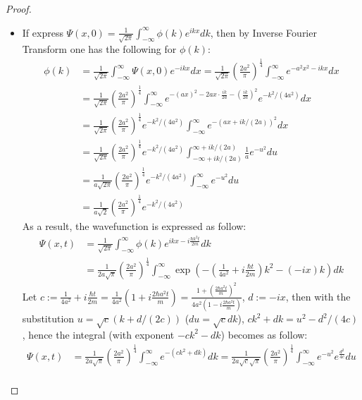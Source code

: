\documentclass{article}
\begin{document}
\begin{proof}
\begin{itemize}
        \item[2.] If express $\Psi(x,0)=\frac{1}{\sqrt{2\pi}}\int_{-\infty}^{\infty}\phi(k)e^{ikx}dk$, then by Inverse Fourier Transform one has the following for $\phi(k)$:
        \begin{align}
            \phi(k)&=\frac{1}{\sqrt{2\pi}}\int_{-\infty}^{\infty}\Psi(x,0)e^{-ikx}dx = \frac{1}{\sqrt{2\pi}}\left(\frac{2a^2}{\pi}\right)^\frac{1}{4}\int_{-\infty}^{\infty}e^{-a^2x^2-ikx}dx\\
            &= \frac{1}{\sqrt{2\pi}}\left(\frac{2a^2}{\pi}\right)^\frac{1}{4}\int_{-\infty}^{\infty}e^{-(ax)^2 - 2ax\cdot\frac{ik}{2a} - \left(\frac{ik}{2a}\right)^2}e^{-k^2/(4a^2)}dx\\
            &= \frac{1}{\sqrt{2\pi}}\left(\frac{2a^2}{\pi}\right)^\frac{1}{4}e^{-k^2/(4a^2)}\int_{-\infty}^{\infty}e^{-(ax+ik/(2a))^2}dx\\
            &= \frac{1}{\sqrt{2\pi}}\left(\frac{2a^2}{\pi}\right)^\frac{1}{4}e^{-k^2/(4a^2)}\int_{-\infty+ik/(2a)}^{\infty+ik/(2a)}\frac{1}{a}e^{-u^2}du\\
            &= \frac{1}{a\sqrt{2\pi}}\left(\frac{2a^2}{\pi}\right)^\frac{1}{4}e^{-k^2/(4a^2)}\int_{-\infty}^{\infty}e^{-u^2}du\\
            &= \frac{1}{a\sqrt{2}}\left(\frac{2a^2}{\pi}\right)^\frac{1}{4}e^{-k^2/(4a^2)}
        \end{align}
        As a result, the wavefunction is expressed as follow:
        \begin{align}
            \Psi(x,t)&= \frac{1}{\sqrt{2\pi}}\int_{-\infty}^{\infty}\phi(k)e^{ikx - i\frac{\hbar k^2 t}{2m}}dk\\
            &= \frac{1}{2a\sqrt{\pi}}\left(\frac{2a^2}{\pi}\right)^\frac{1}{4}\int_{-\infty}^{\infty}\exp\left(-\left(\frac{1}{4a^2} + i\frac{\hbar t}{2m}\right)k^2 - (-ix) k\right)dk
        \end{align}
        Let $c:=\frac{1}{4a^2}+i\frac{\hbar t}{2m} = \frac{1}{4a^2}(1+i\frac{2\hbar a^2t}{m}) = \frac{1+\left(\frac{2\hbar a^2t}{m}\right)^2}{4a^2(1-i\frac{2\hbar a^2t}{m})}$, $d:= -ix$, then with the substitution $u=\sqrt{c}(k+d/(2c))$ ($du = \sqrt{c}dk$), $ck^2+dk = u^2 - d^2/(4c)$, hence the integral (with exponent $-ck^2 - dk$) becomes as follow:
        \begin{align}
            \Psi(x,t)&=\frac{1}{2a\sqrt{\pi}}\left(\frac{2a^2}{\pi}\right)^\frac{1}{4}\int_{-\infty}^{\infty}e^{-(ck^2+dk)}dk = \frac{1}{2a\sqrt{c}\sqrt{\pi}}\left(\frac{2a^2}{\pi}\right)^\frac{1}{4}\int_{-\infty}^{\infty}e^{-u^2}e^{\frac{d^2}{4c}}du\\

\end{align}
\end{itemize}
\end{proof}
\end{document}
